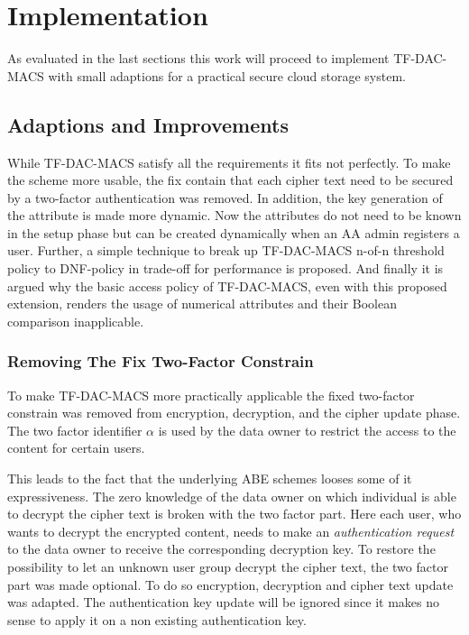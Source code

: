 \chapter{Implementation}
As evaluated in the last sections this work will proceed to implement TF-DAC-MACS \cite{li2017two} with small adaptions for a practical secure cloud storage system. 

\section{Adaptions and Improvements}
While TF-DAC-MACS satisfy all the requirements it fits not perfectly. To make the scheme more usable, the fix contain that each cipher text need to be secured by a two-factor authentication was removed. In addition, the key generation of the attribute is made more dynamic. Now the attributes do not need to be known in the setup phase but can be created dynamically when an AA admin registers a user. Further, a simple technique to break up TF-DAC-MACS n-of-n threshold policy to DNF-policy in trade-off for performance is proposed. And finally it is argued why the basic access policy of TF-DAC-MACS, even with this proposed extension, renders the usage of numerical attributes and their Boolean comparison inapplicable.

\subsection{Removing The Fix Two-Factor Constrain}
\label{sec:removing-the-fix-two-factor-constrain}
To make \ac{TF-DAC-MACS} more practically applicable the fixed two-factor constrain was removed from encryption, decryption, and the cipher update phase. The two factor identifier $\alpha$ is used by the data owner to restrict the access to the content for certain users. 

This leads to the fact that the underlying \ac{ABE} schemes looses some of it expressiveness. The zero knowledge of the data owner on which individual is able to decrypt the cipher text is broken with the two factor part. Here each user, who wants to decrypt the encrypted content, needs to make an \textit{authentication request} to the data owner to receive the corresponding decryption key. To restore the possibility to let an unknown user group decrypt the cipher text, the two factor part was made optional. To do so encryption, decryption and cipher text update was adapted. The authentication key update will be ignored since it makes no sense to apply it on a non existing authentication key. 

